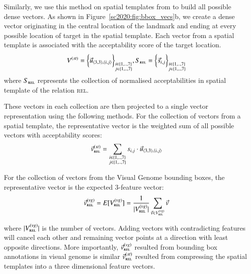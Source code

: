 Similarly, we use this method on spatial templates from
\cite{logan1996computational} to build all possible dense vectors. As shown in
Figure~\ref{sc2020:fig:bbox_vecs}b, we create a dense vector originating in
the central location of the landmark and ending at every possible location
of target in the spatial template. 	
Each vector from a spatial template is associated with the acceptability score
of the target location.
\begin{align}
V^{(st)} = \bigg\{ \vec{u}_{\langle 3, 3\rangle, \langle i, j\rangle} \bigg\}_{\substack{
		i \in \{1,..,7\} \\
		j \in \{1,..,7\}
	}}, S_{\textsc{rel}} = \bigg\{ \vec{s}_{i,j} \bigg\}_{\substack{
		i \in \{1,..,7\} \\
		j \in \{1,..,7\} 
}} 
\end{align}
\noindent where $S_{\textsc{rel}}$ represents the collection of normalised acceptabilities in spatial template of the relation \textsc{rel}. 

These vectors in each collection are then projected to a single vector
representation using the following methods. 
For the collection of vectors from
a spatial template, the representative vector is the weighted sum of all possible vectors with acceptability scores:
\begin{equation}
	\vec{v}_{\textsc{rel}}^{(st)} = \sum_{\substack{
			i \in \{1,..,7\} \\
			j \in \{1,..,7\} 
		}}{s_{i,j} \cdot \vec{u}_{\langle 3, 3\rangle, \langle i, j\rangle}}
\end{equation}

\noindent For the collection of vectors from the Visual Genome bounding boxes, 
the representative vector is the expected 3-feature vector:
\begin{equation}
	\vec{v}_{\textsc{rel}}^{(vg)} = E[V_{\textsc{rel}}^{(vg)}] = \frac{1}{|V_{\textsc{rel}}^{(vg)}|}\sum_{\vec{v} \in V_{\textsc{rel}}^{(vg)}}{\vec{v}}
\end{equation}

\noindent where $|V_{\textsc{rel}}^{(vg)}|$ is the number of vectors. Adding vectors with contradicting features will cancel each other and remaining vector points at a direction with least opposite directions. More importantly, $\vec{v}_{\textsc{rel}}^{(vg)}$ resulted from bounding box annotations in visual genome is similar $\vec{v}_{\textsc{rel}}^{(st)}$ resulted from compressing the spatial templates into a three dimensional feature vectors. 


